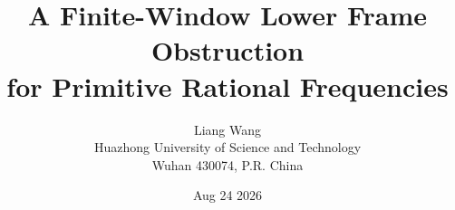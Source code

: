 \documentclass[11pt]{article}
\title{\textbf{A Finite-Window Lower Frame Obstruction\\
for Primitive Rational Frequencies}}
\author{
  Liang Wang\\
  \small Huazhong University of Science and Technology\\
  \small Wuhan 430074, P.R. China
}
\date{Aug 24 2026}
\theoremstyle{remark}
\begin{document}
\maketitle

\begin{abstract}

\end{abstract}











\end{document}
